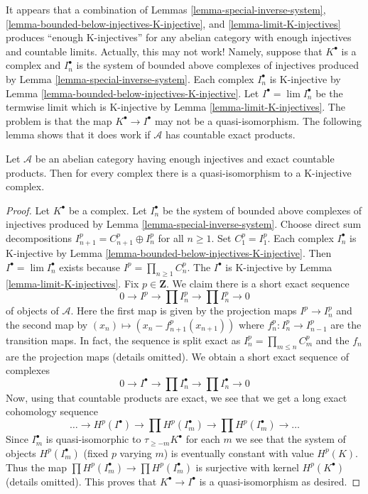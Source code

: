 \begin{remark}
\label{remark-difficulty-K-injectives}
It appears that a combination of
Lemmas \ref{lemma-special-inverse-system},
\ref{lemma-bounded-below-injectives-K-injective}, and
\ref{lemma-limit-K-injectives}
produces ``enough K-injectives'' for any abelian category with enough
injectives and countable limits. Actually, this may not work!
Namely, suppose that $K^\bullet$ is a complex and $I_n^\bullet$ is the
system of bounded above complexes of injectives produced by
Lemma \ref{lemma-special-inverse-system}.
Each complex $I_n^\bullet$ is K-injective by
Lemma \ref{lemma-bounded-below-injectives-K-injective}.
Let $I^\bullet = \lim I_n^\bullet$ be the termwise limit which is
K-injective by
Lemma \ref{lemma-limit-K-injectives}.
The problem is that the map $K^\bullet \to I^\bullet$ may not be a
quasi-isomorphism. The following lemma shows that it does work if
$\mathcal{A}$ has countable exact products.
\end{remark}

\begin{lemma}
\label{lemma-enough-K-injectives-Ab4*}
Let $\mathcal{A}$ be an abelian category having enough injectives
and exact countable products. Then for every complex
there is a quasi-isomorphism to a K-injective complex.
\end{lemma}

\begin{proof}
Let $K^\bullet$ be a complex. Let $I_n^\bullet$ be the
system of bounded above complexes of injectives produced by
Lemma \ref{lemma-special-inverse-system}.
Choose direct sum decompositions $I_{n + 1}^p = C_{n + 1}^p \oplus I_n^p$
for all $n \geq 1$. Set $C_1^p = I_1^p$.
Each complex $I_n^\bullet$ is K-injective by
Lemma \ref{lemma-bounded-below-injectives-K-injective}.
Then $I^\bullet = \lim I_n^\bullet$ exists because
$I^p = \prod_{n \geq 1} C_n^p$.
The $I^\bullet$ is K-injective by
Lemma \ref{lemma-limit-K-injectives}.
Fix $p \in \mathbf{Z}$. We claim there is a short exact sequence
$$
0 \to I^p \to \prod I_n^p \to \prod I_n^p \to 0
$$
of objects of $\mathcal{A}$. Here the first map is given by
the projection maps $I^p \to I_n^p$ and the second map
by $(x_n) \mapsto (x_n - f^p_{n + 1}(x_{n + 1}))$ where
$f^p_n : I_n^p \to I_{n - 1}^p$ are the transition maps.
In fact, the sequence is split exact as
$I_n^p = \prod_{m \leq n} C_m^p$ and the $f_n$ are the projection maps
(details omitted). We obtain a short exact sequence of complexes
$$
0 \to I^\bullet \to \prod I_n^\bullet \to \prod I_n^\bullet \to 0
$$
Now, using that countable products are exact, we see that
we get a long exact cohomology sequence
$$
\ldots \to 
H^p(I^\bullet) \to
\prod H^p(I_m^\bullet) \to
\prod H^p(I_m^\bullet) \to \ldots
$$
Since $I_m^\bullet$ is quasi-isomorphic to $\tau_{\geq -m}K^\bullet$ for each
$m$ we see that the system of objects $H^p(I_m^\bullet)$ (fixed $p$ varying $m$)
is eventually constant with value $H^p(K)$. Thus the map
$\prod H^p(I_m^\bullet) \to \prod H^p(I_m^\bullet)$ is surjective with
kernel $H^p(K^\bullet)$ (details omitted). This proves that
$K^\bullet \to I^\bullet$ is a quasi-isomorphism as desired.
\end{proof}

